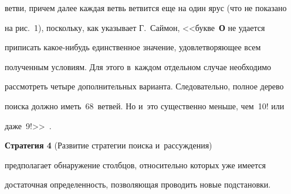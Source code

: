 ветви, причем далее каждая ветвь ветвится еще на один ярус (что не показано 


на рис.~1), поскольку, как указывает Г.~Саймон, <<букве~\textbf{О} не удается 


приписать ка\-кое-ни\-будь единственное значение, удовлетворяющее всем 


полученным условиям. Для этого в~каждом отдельном случае необходимо 


рассмотреть четыре дополнительных варианта. Следовательно, полное дерево 


поиска должно иметь~68~ветвей. Но и~это существенно меньше, чем~10! или 


даже~9!>>~\cite[c.~40]{7-kor}. 


    


 


  











    \smallskip


    


    \textbf{Стратегия 4} (Развитие стратегии поиска и~рассуждения) 


предполагает обнаружение столбцов, относительно которых уже имеется 


достаточная определенность, позволяющая проводить новые подстановки.





